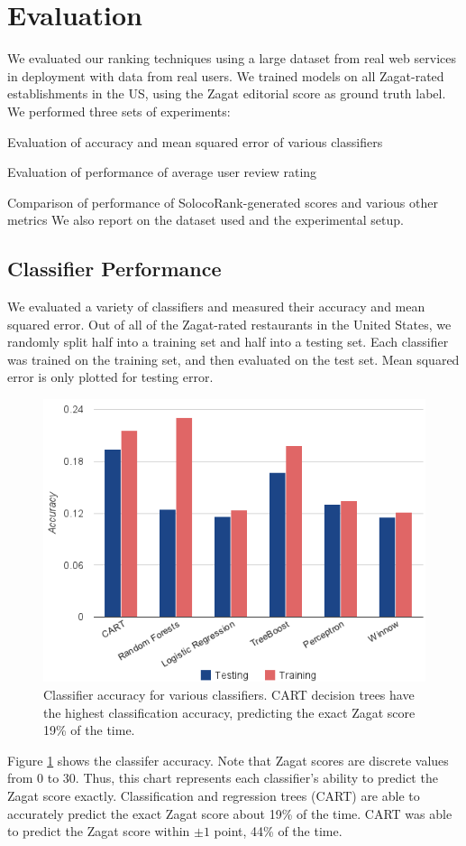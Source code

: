 \section{Evaluation}
\label{sec:evaluation}
We evaluated our ranking techniques using a large dataset
from real web services in deployment with data from real users.
We trained models on all Zagat-rated establishments in the US,
using the Zagat editorial score as ground truth label.
We performed three sets of experiments:
\squishlist
  \item Evaluation of accuracy and mean squared error of various classifiers
  \item Evaluation of performance of average user review rating
  \item Comparison of performance of SolocoRank-generated scores and various other metrics
\squishend
We also report on the dataset used and the experimental setup.

\subsection{Classifier Performance}
\label{sec:classifierperformance}
We evaluated a variety of classifiers and measured their accuracy and mean squared error.
Out of all of the Zagat-rated restaurants in the United States,
we randomly split half into a training set and half into a testing set.
Each classifier was trained on the training set, and then evaluated on the test set.
Mean squared error is only plotted for testing error.

\begin{figure}
  \includegraphics[width=.5\textwidth]{fig/classifieraccuracy.png}
  \caption{Classifier accuracy for various classifiers. 
  CART decision trees have the highest classification accuracy,
  predicting the exact Zagat score 19\% of the time.}
  \label{fig:classifieraccuracy}
\end{figure}

Figure \ref{fig:classifieraccuracy} shows the classifer accuracy.
Note that Zagat scores are discrete values from 0 to 30.
Thus, this chart represents each classifier's ability to
predict the Zagat score exactly.
Classification and regression trees (CART) are able to accurately 
predict the exact Zagat score about 19\% of the time.
CART was able to predict the Zagat score within $\pm1$ point, 44\% of the time.

